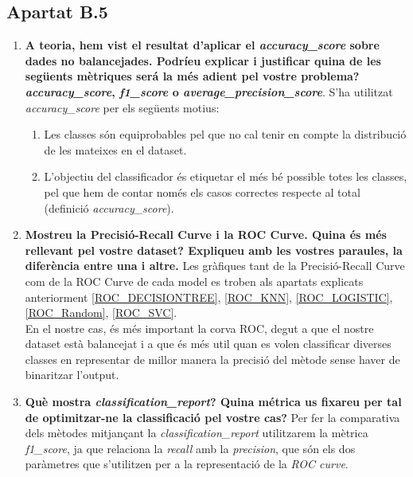 \documentclass[a4paper, 11pt]{article}
\begin{document}
\subsection{Apartat B.5}
\begin{enumerate}
    \item \textbf{A teoria, hem vist el resultat d'aplicar el \textit{accuracy\_score} sobre dades no balancejades. Podríeu explicar i justificar quina de les següents mètriques será la més adient pel vostre problema? \textit{accuracy\_score}, \textit{f1\_score} o \textit{average\_precision\_score}}. S'ha utilitzat \textit{accuracy\_score} per els següents motius:
    \begin{enumerate}
        \item Les classes són equiprobables pel que no cal tenir en compte la distribució de les mateixes en el dataset.
        \item L'objectiu del classificador és etiquetar el més bé possible totes les classes, pel que hem de contar només els casos correctes respecte al total (definició \textit{accuracy\_score}).
    \end{enumerate}
    \item \textbf{Mostreu la Precisió-Recall Curve i la ROC Curve. Quina és més rellevant pel vostre dataset? Expliqueu amb les vostres paraules, la diferència entre una i altre.} Les gràfiques tant de la Precisió-Recall Curve com de la ROC Curve de cada model es troben als apartats explicats anteriorment \textcolor{blue}{\ref{ROC_DECISIONTREE}}, \textcolor{blue}{\ref{ROC_KNN}}, \textcolor{blue}{\ref{ROC_LOGISTIC}}, \textcolor{blue}{\ref{ROC_Random}}, \textcolor{blue}{\ref{ROC_SVC}}.\\
    En el nostre cas, és més important la corva ROC, degut a que el nostre dataset està balancejat i a que és més util quan es volen classificar diverses classes en representar de millor manera la precisió del mètode sense haver de binaritzar l'output.
    \item \textbf{Què mostra \textit{classification\_report}? Quina métrica us fixareu per tal de optimitzar-ne la classificació pel vostre cas?} Per fer la comparativa dels mètodes mitjançant la \textit{classification\_report} utilitzarem la mètrica \textit{f1\_score}, ja que relaciona la \textit{recall} amb la \textit{precision}, que són els dos paràmetres que s'utilitzen per a la representació de la \textit{ROC curve}.
    
\end{enumerate}
\newpage
\end{document}

